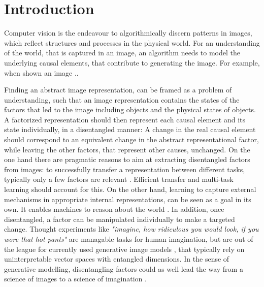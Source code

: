 \chapter{Introduction}

	Computer vision is the endeavour to algorithmically discern patterns in images, which reflect structures and processes in the physical world. For an understanding of the world, that is captured in an image, an algorithm needs to model the underlying causal elements, that contribute to generating the image.
	For example, when shown an image ..

	Finding an abstract image representation, can be framed as a problem of understanding, such that an image representation contains the states of the factors that led to the image including objects and the physical states of objects.
	A factorized representation should then represent each causal element and its state individually, in a disentangled manner: A change in the real causal element should correspond to an equivalent change in the abstract representational factor, while leaving the other factors, that represent other causes, unchanged.
	On the one hand there are pragmatic reasons to aim at extracting disentangled factors from images: to successfully transfer a representation between different tasks, typically only a few factors are relevant \cite{Bengio:2013bu}.
	Efficient transfer and multi-task learning should account for this.
	On the other hand, learning to capture external mechanisms in appropriate internal representations, can be seen as a goal in its own.
	It enables machines to reason about the world \cite{Pearl:2018im}.
	In addition, once disentangled, a factor can be manipulated individually to make a targeted change.
	Thought experiments like \textit{"imagine, how ridiculous you would look, if you wore that hot pants"} are managable tasks for human imagination, but are out of the league for currently used generative image models \cite{Goodfellow:2014td, Kingma:2013tz}, that typically rely on uninterpretable vector spaces with entangled dimensions.
	In the sense of generative modelling, disentangling factors could as well lead the way from a science of images to a science of imagination \cite{Mahadevan:2018tz}.

